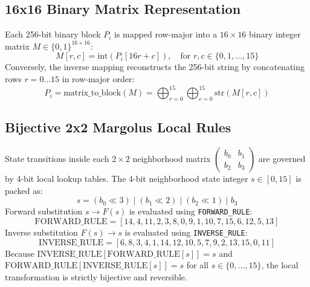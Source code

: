 \subsection{16x16 Binary Matrix Representation}
\label{subsec:matrix_mapping}
Each 256-bit binary block $P_i$ is mapped row-major into a $16 \times 16$ binary integer matrix $M \in \{0, 1\}^{16 \times 16}$:
\begin{equation}
M[r, c] = \text{int}(P_i[16r + c]), \quad \text{for } r, c \in \{0, 1, \dots, 15\}
\label{eq:block_to_matrix}
\end{equation}
Conversely, the inverse mapping reconstructs the 256-bit string by concatenating rows $r = 0 \dots 15$ in row-major order:
\begin{equation}
P_i = \text{matrix\_to\_block}(M) = \bigoplus_{r=0}^{15} \bigoplus_{c=0}^{15} \text{str}(M[r, c])
\label{eq:matrix_to_block}
\end{equation}

\subsection{Bijective 2x2 Margolus Local Rules}
\label{subsec:margolus_rules}
State transitions inside each $2 \times 2$ neighborhood matrix $\begin{pmatrix} b_0 & b_1 \\ b_2 & b_3 \end{pmatrix}$ are governed by 4-bit local lookup tables. The 4-bit neighborhood state integer $s \in [0, 15]$ is packed as:
\begin{equation}
s = (b_0 \ll 3) \mid (b_1 \ll 2) \mid (b_2 \ll 1) \mid b_3
\label{eq:state_pack}
\end{equation}
Forward substitution $s \to F(s)$ is evaluated using \texttt{FORWARD\_RULE}:
\begin{equation}
\text{FORWARD\_RULE} = [14, 4, 11, 2, 3, 8, 0, 9, 1, 10, 7, 15, 6, 12, 5, 13]
\label{eq:forward_rule}
\end{equation}
Inverse substitution $F(s) \to s$ is evaluated using \texttt{INVERSE\_RULE}:
\begin{equation}
\text{INVERSE\_RULE} = [6, 8, 3, 4, 1, 14, 12, 10, 5, 7, 9, 2, 13, 15, 0, 11]
\label{eq:inverse_rule}
\end{equation}
Because $\text{INVERSE\_RULE}[\text{FORWARD\_RULE}[s]] = s$ and $\text{FORWARD\_RULE}[\text{INVERSE\_RULE}[s]] = s$ for all $s \in \{0, \dots, 15\}$, the local transformation is strictly bijective and reversible.

